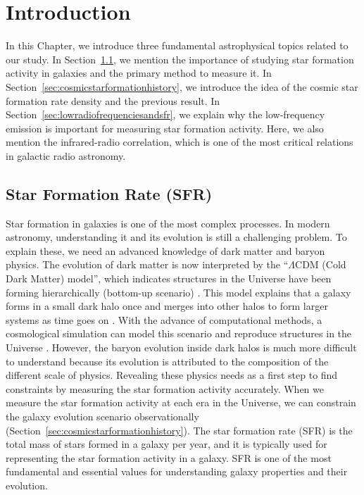 \chapter{Introduction}\label{chap:introduction}
\begin{chapabstract}

In this Chapter, we introduce three fundamental astrophysical topics related to our study.
In Section~\ref{sec:starformationrate}, we mention the importance of studying star formation activity in galaxies and the primary method to measure it.
In Section~\ref{sec:cosmicstarformationhistory}, we introduce the idea of the cosmic star formation rate density and the previous result.
In Section~\ref{sec:lowradiofrequenciesandsfr}, we explain why the low-frequency emission is important for measuring star formation activity.
Here, we also mention the infrared-radio correlation, which is one of the most critical relations in galactic radio astronomy.


\end{chapabstract}

\section{Star Formation Rate (SFR)}\label{sec:starformationrate}

Star formation in galaxies is one of the most complex processes.
In modern astronomy, understanding it and its evolution is still a challenging problem.
To explain these, we need an advanced knowledge of dark matter and baryon physics.
The evolution of dark matter is now interpreted by the ``$\Lambda$CDM (Cold Dark Matter) model'', which indicates structures in the Universe have been forming hierarchically (bottom-up scenario) \citep[e.g.,][]{Peebles1982}.
This model explains that a galaxy forms in a small dark halo once and merges into other halos to form larger systems as time goes on \citep[e.g.,][]{Blumenthal1984}.
With the advance of computational methods, a cosmological simulation can model this scenario and reproduce structures in the Universe \citep[e.g.,][]{Navarro2000, Vale2004}.
However, the baryon evolution inside dark halos is much more difficult to understand because its evolution is attributed to the composition of the different scale of physics.
Revealing these physics needs as a first step to find constraints by measuring the star formation activity accurately.
When we measure the star formation activity at each era in the Universe, we can constrain the galaxy evolution scenario observationally (Section~\ref{sec:cosmicstarformationhistory}).
The star formation rate (SFR) is the total mass of stars formed in a galaxy per year, and it is typically used for representing the star formation activity in a galaxy.
SFR is one of the most fundamental and essential values for understanding galaxy properties and their evolution.

